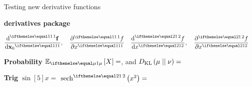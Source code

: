 \documentclass{article}
\begin{document}
Testing new derivative functions

\textbf{derivatives package}

$$\der{\vec{f}}{\vec{x}_0}, \quad \pder{f}{x} \quad \der[2]{f}{x}, \quad \pder[2]{f}{x}$$

\textbf{Probability}
$\E[\mu]{X} = $, 
and 
$D_\mathrm{KL} \left( \mu \mid \mid \nu \right) = $

\textbf{Trig}
$\sin[5]{x} = $
$\sech[2]{x^2} = $
\end{document}
